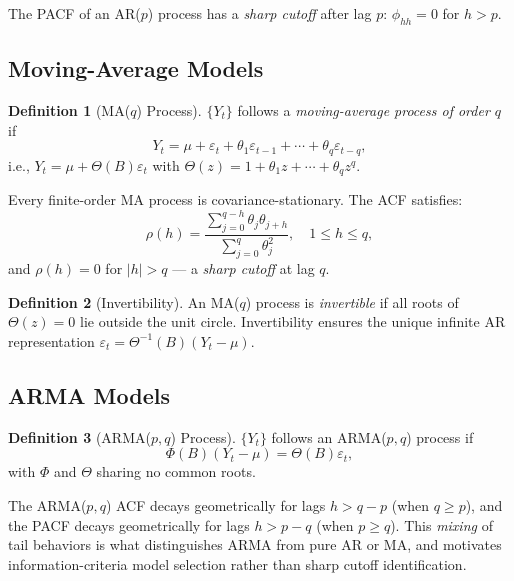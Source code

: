 \documentclass[conference]{IEEEtran}
\theoremstyle{definition}
\newtheorem{definition}{Definition}[section]
\begin{document}
The PACF of an AR($p$) process has a \emph{sharp cutoff} after lag $p$:
$\phi_{hh} = 0$ for $h > p$.

\subsection{Moving-Average Models}

\begin{definition}[MA($q$) Process]
$\{Y_t\}$ follows a \emph{moving-average process of order $q$} if
\begin{equation}
  Y_t = \mu + \varepsilon_t + \theta_1\varepsilon_{t-1} + \cdots
        + \theta_q\varepsilon_{t-q},
  \label{eq:ma_q}
\end{equation}
i.e., $Y_t = \mu + \Theta(B)\varepsilon_t$ with
$\Theta(z) = 1 + \theta_1 z + \cdots + \theta_q z^q$.
\end{definition}

Every finite-order MA process is covariance-stationary. The ACF satisfies:
\begin{equation}
  \rho(h) = \frac{\sum_{j=0}^{q-h}\theta_j\theta_{j+h}}
                 {\sum_{j=0}^{q}\theta_j^2}, \quad 1 \leq h \leq q,
  \label{eq:ma_acf}
\end{equation}
and $\rho(h) = 0$ for $|h| > q$ --- a \emph{sharp cutoff} at lag $q$.

\begin{definition}[Invertibility]
An MA($q$) process is \emph{invertible} if all roots of $\Theta(z) = 0$ lie
outside the unit circle. Invertibility ensures the unique infinite AR
representation $\varepsilon_t = \Theta^{-1}(B)(Y_t - \mu)$.
\end{definition}

\subsection{ARMA Models}

\begin{definition}[ARMA($p,q$) Process]
$\{Y_t\}$ follows an ARMA($p,q$) process if
\begin{equation}
  \Phi(B)(Y_t - \mu) = \Theta(B)\varepsilon_t,
  \label{eq:arma}
\end{equation}
with $\Phi$ and $\Theta$ sharing no common roots.
\end{definition}

The ARMA($p,q$) ACF decays geometrically for lags $h > q - p$ (when
$q \geq p$), and the PACF decays geometrically for lags $h > p - q$
(when $p \geq q$). This \emph{mixing} of tail behaviors is what
distinguishes ARMA from pure AR or MA, and motivates information-criteria
model selection rather than sharp cutoff identification.
\end{document}
